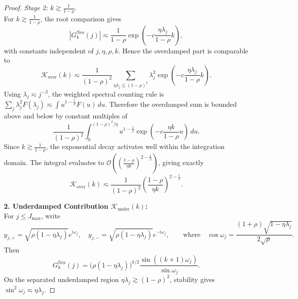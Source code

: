 \begin{proof}
\textit{Stage 2: $k \gtrsim \frac{1}{1-\rho}$.} \\
For $k \gtrsim \frac{1}{1-\rho}$, the root comparison gives
\[
    |G_k^{\mathrm{Nes}}(j)|
    \eqsim
    \frac{1}{1-\rho}
    \exp\left(-c\frac{\eta\lambda_j}{1-\rho}k\right),
\]
with constants independent of $j,\eta,\rho,k$. Hence the overdamped part is comparable to
\[
    \mathcal{K}_{\mathrm{over}}(k)
    \eqsim
    \frac{1}{(1-\rho)^2}
    \sum_{\eta\lambda_j\lesssim (1-\rho)^2}
    \lambda_j^2
    \exp\left(-c\frac{\eta\lambda_j}{1-\rho}k\right).
\]
Using $\lambda_j\eqsim j^{-\beta}$, the weighted spectral counting rule is $\sum_j \lambda_j^2 F(\lambda_j) \eqsim \int u^{1-\frac1\beta}F(u)\,du$. Therefore the overdamped sum is bounded above and below by constant multiples of
\[
    \frac{1}{(1-\rho)^2}
    \int_0^{(1-\rho)^2/\eta}
    u^{1-\frac1\beta}
    \exp\left(-c\frac{\eta k}{1-\rho}u\right)\,du .
\]
Since $k \gtrsim \frac{1}{1-\rho}$, the exponential decay activates well within the integration domain. The integral evaluates to $\mathcal{O}\left( \left(\frac{1-\rho}{\eta k}\right)^{2-\frac1\beta} \right)$, giving exactly
\begin{equation*}
    \mathcal K_{\mathrm{over}}(k)
    \eqsim
    \frac{1}{(1-\rho)^2}
    \left(\frac{1-\rho}{\eta k}\right)^{2-\frac1\beta}.
\end{equation*}

\textbf{2. Underdamped Contribution $\mathcal{K}_{\mathrm{under}}(k)$:} \\
For $j \le J_{\max}$, write
\[
    y_{j,+}=\sqrt{\rho(1-\eta\lambda_j)} e^{i\omega_j},
    \quad
    y_{j,-}=\sqrt{\rho(1-\eta\lambda_j)} e^{-i\omega_j},
    \qquad \text{where} \quad
    \cos \omega_j=\frac{(1+\rho)\sqrt{1-\eta\lambda_j}}{2\sqrt \rho}.
\]
Then
\begin{equation*}
    G_k^{\mathrm{Nes}}(j)=\bigl(\rho(1-\eta\lambda_j)\bigr)^{k/2}\frac{\sin((k+1)\omega_j)}{\sin \omega_j}.
\end{equation*}
On the separated underdamped region $\eta\lambda_j\gtrsim(1-\rho)^2$, stability gives $\sin^2\omega_j \eqsim \eta\lambda_j$. 


\end{proof}
